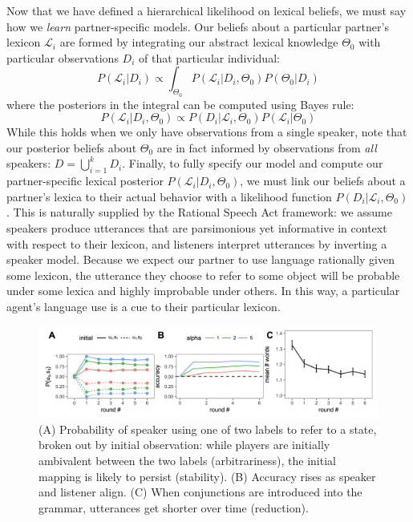 \documentclass[12pt, donotrepeattitle, man, floatsintext]{apa6}
\begin{document}
Now that we have defined a hierarchical likelihood on lexical beliefs, we must say how we \emph{learn} partner-specific models. Our beliefs about a particular partner's lexicon $\mathcal{L}_i$ are formed by integrating our abstract lexical knowledge $\Theta_0$ with particular  observations $D_i$ of that particular individual:
$$%
P(\mathcal{L}_i | D_i)  \propto \int_{\Theta_0}P(\mathcal{L}_i | D_i,  \Theta_0) P(\Theta_0 | D_i) 
$$
where the posteriors in the integral can be computed using Bayes rule:
$$
P(\mathcal{L}_i | D_i, \Theta_0) \propto P(D_i | \mathcal{L}_i, \Theta_0) P(\mathcal{L}_i | \Theta_0)
$$
While this holds when we only have observations from a single speaker, note that our posterior beliefs about $\Theta_0$ are in fact informed by observations from \emph{all} speakers: $D = \bigcup_{i=1}^k D_i$. Finally, to fully specify our model and compute our partner-specific lexical posterior $P(\mathcal{L}_i |D_i, \Theta_0)$, we must link our beliefs about a partner's lexica to their actual behavior with a likelihood function $P(D_i | \mathcal{L}_i, \Theta_0)$. This is naturally supplied by the Rational Speech Act framework: we assume speakers produce utterances that are parsimonious yet informative in context with respect to their lexicon, and listeners interpret utterances by inverting a speaker model. Because we expect our partner to use language rationally given some lexicon, the utterance they choose to refer to some object will be probable under some lexica and highly improbable under others. In this way, a particular agent's language use is a cue to their particular lexicon. 

\begin{figure}[t]
\centering
\includegraphics[scale=.36]{model_results.png}
\caption{ (A) Probability of speaker using one of two labels to refer to a state, broken out by initial observation: while players are initially ambivalent between the two labels (arbitrariness), the initial mapping is likely to persist (stability). (B) Accuracy rises as speaker and listener align. (C) When conjunctions are introduced into the grammar, utterances get shorter over time (reduction).}
\label{fig:modelresults}
\end{figure}
\end{document}
